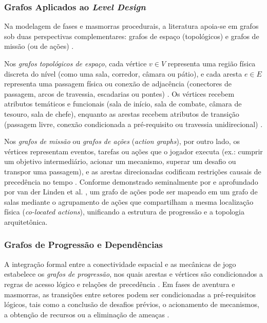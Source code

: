 \subsubsection{Grafos Aplicados ao \textit{Level Design}}
\label{sec:grafos_level_design}

Na modelagem de fases e masmorras procedurais, a literatura apoia-se em grafos sob duas perspectivas complementares: grafos de espaço (topológicos) e grafos de missão (ou de ações) \cite{dormans2010, linden2013designing, linden2014dungeons, summerville2018procedural}.

Nos \textit{grafos topológicos de espaço}, cada vértice $v \in V$ representa uma região física discreta do nível (como uma sala, corredor, câmara ou pátio), e cada aresta $e \in E$ representa uma passagem física ou conexão de adjacência (conectores de passagem, arcos de travessia, escadarias ou pontes) \cite{dormans2010, linden2014dungeons, summerville2018procedural}. Os vértices recebem atributos temáticos e funcionais (sala de início, sala de combate, câmara de tesouro, sala de chefe), enquanto as arestas recebem atributos de transição (passagem livre, conexão condicionada a pré-requisito ou travessia unidirecional) \cite{dormans2010, linden2014dungeons}.

Nos \textit{grafos de missão} ou \textit{grafos de ações} (\textit{action graphs}), por outro lado, os vértices representam eventos, tarefas ou ações que o jogador executa (ex.: cumprir um objetivo intermediário, acionar um mecanismo, superar um desafio ou transpor uma passagem), e as arestas direcionadas codificam restrições causais de precedência no tempo \cite{dormans2010, linden2013designing}. Conforme demonstrado seminalmente por \textcite{dormans2010} e aprofundado por van der Linden et al. \cite*{linden2013designing, linden2014dungeons}, um grafo de ações pode ser mapeado em um grafo de salas mediante o agrupamento de ações que compartilham a mesma localização física (\textit{co-located actions}), unificando a estrutura de progressão e a topologia arquitetônica.

\subsubsection{Grafos de Progressão e Dependências}
\label{sec:grafos_progressao}

A integração formal entre a conectividade espacial e as mecânicas de jogo estabelece os \textit{grafos de progressão}, nos quais arestas e vértices são condicionados a regras de acesso lógico e relações de precedência \cite{dormans2010, linden2013designing, linden2014dungeons}. Em fases de aventura e masmorras, as transições entre setores podem ser condicionadas a pré-requisitos lógicos, tais como a conclusão de desafios prévios, o acionamento de mecanismos, a obtenção de recursos ou a eliminação de ameaças \cite{dormans2010, shaker2016constructive}.

